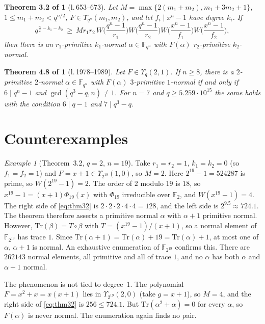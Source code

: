 \documentclass[11pt,a4paper]{amsart}
\newtheorem*{thmA}{Theorem 3.2 of \cite{AN}}
\newtheorem*{thmB}{Theorem 4.8 of \cite{AN}}
\theoremstyle{remark}
\newtheorem{example}[theorem]{Example}
\newcommand{\F}{\mathbb{F}}
\newcommand{\Fqn}{\mathbb{F}_{q^n}}
\newcommand{\Tr}{\mathrm{Tr}}
\begin{document}
\begin{thmA}[l.\,653--673]
Let $M=\max\{2(m_1+m_2),m_1+3m_2+1\}$, $1\le m_1+m_2<q^{n/2}$, $F\in\Upsilon_{q^n}(m_1,m_2)$, and let $f_i\mid x^n-1$
have degree $k_i$. If
\begin{equation}\label{eq:thm32}
q^{\frac n2-k_1-k_2}\ \ge\ M r_1r_2\,W\!\Big(\frac{q^n-1}{r_1}\Big)W\!\Big(\frac{q^n-1}{r_2}\Big)
W\!\Big(\frac{x^n-1}{f_1}\Big)W\!\Big(\frac{x^n-1}{f_2}\Big),
\end{equation}
then there is an $r_1$-primitive $k_1$-normal $\alpha\in\Fqn$ with $F(\alpha)$ $r_2$-primitive $k_2$-normal.
\end{thmA}

\begin{thmB}[l.\,1978--1989]
Let $F\in\Upsilon_q(2,1)$. If $n\ge8$, there is a $2$-primitive $2$-normal $\alpha\in\Fqn$ with $F(\alpha)$
$3$-primitive $1$-normal if and only if $6\mid q^n-1$ and $\gcd(q^3-q,n)\ne1$. For $n=7$ and $q\ge5.259\cdot10^{15}$
the same holds with the condition $6\mid q-1$ and $7\mid q^3-q$.
\end{thmB}

\section{Counterexamples}\label{sec:ce}

\begin{example}[Theorem~3.2, $q=2$, $n=19$]\label{ex:219}
Take $r_1=r_2=1$, $k_1=k_2=0$ (so $f_1=f_2=1$) and $F=x+1\in\Upsilon_{2^{19}}(1,0)$, so $M=2$. Here $2^{19}-1=524287$
is prime, so $W(2^{19}-1)=2$. The order of $2$ modulo $19$ is $18$, so $x^{19}-1=(x+1)\Phi_{19}(x)$ with $\Phi_{19}$
irreducible over $\F_2$, and $W(x^{19}-1)=4$. The right side of \eqref{eq:thm32} is $2\cdot2\cdot2\cdot4\cdot4=128$,
and the left side is $2^{9.5}\approx724.1$. The theorem therefore asserts a primitive normal $\alpha$ with $\alpha+1$
primitive normal. However, $\Tr(\beta)=T\circ\beta$ with $T=(x^{19}-1)/(x+1)$, so a normal element of $\F_{2^{19}}$
has trace $1$. Since $\Tr(\alpha+1)=\Tr(\alpha)+19=\Tr(\alpha)+1$, at most one of $\alpha$, $\alpha+1$ is normal.
An exhaustive enumeration of $\F_{2^{19}}$ confirms this. There are $262143$ normal elements, all primitive and all of
trace $1$, and no $\alpha$ has both $\alpha$ and $\alpha+1$ normal.

The phenomenon is not tied to degree~$1$. The polynomial $F=x^2+x=x(x+1)$ lies in $\Upsilon_{2^{19}}(2,0)$ (take
$g=x+1$), so $M=4$, and the right side of \eqref{eq:thm32} is $256\le724.1$. But $\Tr(\alpha^2+\alpha)=0$ for every
$\alpha$, so $F(\alpha)$ is never normal. The enumeration again finds no pair.
\end{example}
\end{document}
